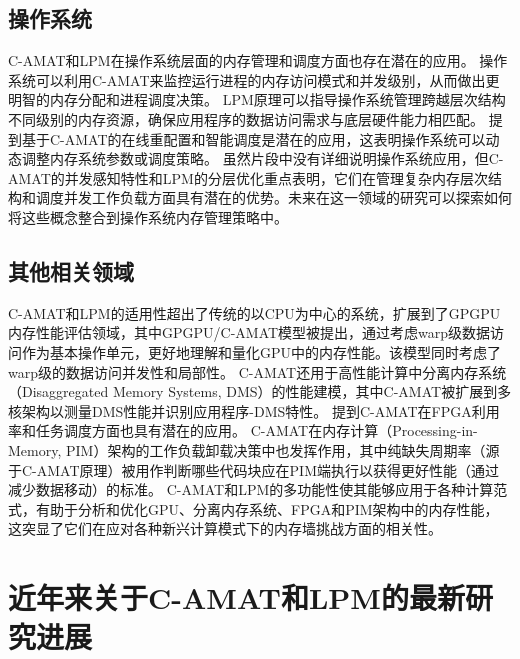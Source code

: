 \documentclass[UTF8]{ctexart}
\begin{document}
\subsection{操作系统}
C-AMAT和LPM在操作系统层面的内存管理和调度方面也存在潜在的应用\cite{sunCAMATPage}。
操作系统可以利用C-AMAT来监控运行进程的内存访问模式和并发级别，从而做出更明智的内存分配和进程调度决策。
LPM原理可以指导操作系统管理跨越层次结构不同级别的内存资源，确保应用程序的数据访问需求与底层硬件能力相匹配。
\cite{sun2018optimizing}提到基于C-AMAT的在线重配置和智能调度是潜在的应用，这表明操作系统可以动态调整内存系统参数或调度策略。
虽然片段中没有详细说明操作系统应用，但C-AMAT的并发感知特性和LPM的分层优化重点表明，它们在管理复杂内存层次结构和调度并发工作负载方面具有潜在的优势。未来在这一领域的研究可以探索如何将这些概念整合到操作系统内存管理策略中。

\subsection{其他相关领域}
C-AMAT和LPM的适用性超出了传统的以CPU为中心的系统，扩展到了GPGPU内存性能评估领域，其中GPGPU/C-AMAT模型被提出，通过考虑warp级数据访问作为基本操作单元，更好地理解和量化GPU中的内存性能\cite{zhang2017evaluating}。该模型同时考虑了warp级的数据访问并发性和局部性。
C-AMAT还用于高性能计算中分离内存系统（Disaggregated Memory Systems, DMS）的性能建模，其中C-AMAT被扩展到多核架构以测量DMS性能并识别应用程序-DMS特性\cite{sun2020performance}。
\cite{sunCAMATPage}提到C-AMAT在FPGA利用率和任务调度方面也具有潜在的应用。
C-AMAT在内存计算（Processing-in-Memory, PIM）架构的工作负载卸载决策中也发挥作用，其中纯缺失周期率（源于C-AMAT原理）被用作判断哪些代码块应在PIM端执行以获得更好性能（通过减少数据移动）的标准\cite{wang2021copim}。
C-AMAT和LPM的多功能性使其能够应用于各种计算范式，有助于分析和优化GPU、分离内存系统、FPGA和PIM架构中的内存性能，这突显了它们在应对各种新兴计算模式下的内存墙挑战方面的相关性。

\section{近年来关于C-AMAT和LPM的最新研究进展}
\end{document}
